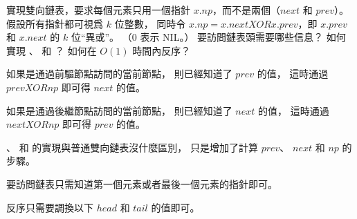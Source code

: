 \startEXERCISE\DIFFICULT
實現雙向鏈表，要求每個元素只用一個指針 $x.np$，而不是兩個（$next$ 和 $prev$）。
假設所有指針都可視爲 $k$ 位整數，
同時令 $x.np = x.next \mathbin{XOR} x.prev$，即 $x.prev$ 和 $x.next$ 的 $k$ 位“異或”。
（0 表示 NIL。）
要訪問鏈表頭需要哪些信息？
如何實現 、  和 ？
如何在 $O(1)$ 時間內反序？
\stopEXERCISE

\startANSWER
如果是通過前驅節點訪問的當前節點，
則已經知道了 $prev$ 的值，
這時通過 $prev \mathbin{XOR} np$ 即可得 $next$ 的值。

如果是通過後繼節點訪問的當前節點，
則已經知道了 $next$ 的值，
這時通過 $next \mathbin{XOR} np$ 即可得 $prev$ 的值。

、  和  的實現與普通雙向鏈表沒什麼區別，
只是增加了計算 $prev$、 $next$ 和 $np$ 的步驟。

要訪問鏈表只需知道第一個元素或者最後一個元素的指針即可。

反序只需要調換以下 $head$ 和 $tail$ 的值即可。
\stopANSWER

